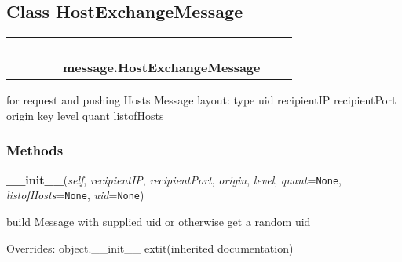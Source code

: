 
\subsection{Class HostExchangeMessage}

    \label{message:HostExchangeMessage}
\begin{tabular}{cccccccc}
\multicolumn{2}{r}{\settowidth{\BCL}{object}\multirow{2}{\BCL}{object}}
&&
&&
  \\\cline{3-3}
  &&\multicolumn{1}{c|}{}
&&
&&
  \\
\multicolumn{4}{r}{\settowidth{\BCL}{message.Message}\multirow{2}{\BCL}{message.Message}}
&&
  \\\cline{5-5}
  &&&&\multicolumn{1}{c|}{}
&&
  \\
&&&&\multicolumn{2}{l}{\textbf{message.HostExchangeMessage}}
\end{tabular}

for request and pushing Hosts Message layout: {\textbar} type {\textbar} 
uid {\textbar} recipientIP {\textbar} recipientPort {\textbar} origin key 
{\textbar} level {\textbar} quant {\textbar} listofHosts {\textbar}



  \subsubsection{Methods}

    \vspace{0.5ex}

\hspace{.8\funcindent}\begin{boxedminipage}{\funcwidth}

    \raggedright \textbf{\_\_init\_\_}(\textit{self}, \textit{recipientIP}, \textit{recipientPort}, \textit{origin}, \textit{level}, \textit{quant}={\tt None}, \textit{listofHosts}={\tt None}, \textit{uid}={\tt None})

\setlength{\parskip}{2ex}
    build Message with supplied uid or otherwise get a random uid

\setlength{\parskip}{1ex}
      Overrides: object.\_\_init\_\_ 	extit{(inherited documentation)}

    \end{boxedminipage}

